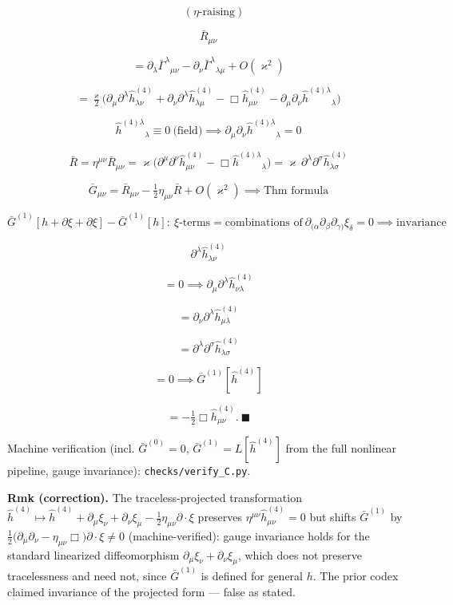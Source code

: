 \begin{theorem}
\[
\quad (\eta\text{-raising})
\]

\[
\bar R_{\mu\nu}
\]

\[
= \partial_\lambda\bar\Gamma^\lambda{}_{\mu\nu}-\partial_\nu\bar\Gamma^\lambda{}_{\lambda\mu}+O(\varkappa^2)
\]

\[
= \tfrac\varkappa2\bigl(\partial_\mu\partial^\lambda\hat h^{(4)}_{\lambda\nu}+\partial_\nu\partial^\lambda\hat h^{(4)}_{\lambda\mu}-\Box\hat h^{(4)}_{\mu\nu}-\partial_\mu\partial_\nu\hat h^{(4)\lambda}{}_\lambda\bigr)
\]

\[
\hat h^{(4)\lambda}{}_\lambda\equiv0\ \text{(field)}\implies\partial_\mu\partial_\nu\hat h^{(4)\lambda}{}_\lambda=0
\]

\[
\bar R=\eta^{\mu\nu}\bar R_{\mu\nu}=\varkappa\bigl(\partial^\mu\partial^\nu\hat h^{(4)}_{\mu\nu}-\Box\hat h^{(4)\lambda}{}_\lambda\bigr)=\varkappa\,\partial^\lambda\partial^\sigma\hat h^{(4)}_{\lambda\sigma}
\]

\[
\bar G_{\mu\nu}=\bar R_{\mu\nu}-\tfrac12\eta_{\mu\nu}\bar R+O(\varkappa^2)\implies\text{Thm formula}
\]

\[
\bar G^{(1)}[h+\partial\xi+\partial\xi]-\bar G^{(1)}[h]:\ \xi\text{-terms}=\text{combinations of}\ \partial_{(\alpha}\partial_\beta\partial_{\gamma)}\xi_\delta=0\implies\text{invariance}
\]

\[
\partial^\lambda\hat h^{(4)}_{\lambda\nu}
\]

\[
= 0\implies\partial_\mu\partial^\lambda\hat h^{(4)}_{\nu\lambda}
\]

\[
= \partial_\nu\partial^\lambda\hat h^{(4)}_{\mu\lambda}
\]

\[
= \partial^\lambda\partial^\sigma\hat h^{(4)}_{\lambda\sigma}
\]

\[
= 0\implies\bar G^{(1)}[\hat h^{(4)}]
\]

\[
= -\tfrac12\Box\hat h^{(4)}_{\mu\nu}.\ \blacksquare
\]

Machine verification (incl. $\bar G^{(0)}=0$, $\bar G^{(1)}=L[\hat h^{(4)}]$ from the full nonlinear pipeline, gauge invariance): \texttt{checks/\allowbreak{}verify\_\allowbreak{}C.py}.

\textbf{Rmk (correction).} The traceless-projected transformation $\hat h^{(4)}\mapsto\hat h^{(4)}+\partial_\mu\xi_\nu+\partial_\nu\xi_\mu-\tfrac12\eta_{\mu\nu}\partial\!\cdot\!\xi$ preserves $\eta^{\mu\nu}\hat h^{(4)}_{\mu\nu}=0$ but shifts $\bar G^{(1)}$ by $\tfrac12\bigl(\partial_\mu\partial_\nu-\eta_{\mu\nu}\Box\bigr)\partial\!\cdot\!\xi\ne0$ (machine-verified): gauge invariance holds for the standard linearized diffeomorphism $\partial_\mu\xi_\nu+\partial_\nu\xi_\mu$, which does not preserve tracelessness and need not, since $\bar G^{(1)}$ is defined for general $h$. The prior codex claimed invariance of the projected form — false as stated.


\end{theorem}
